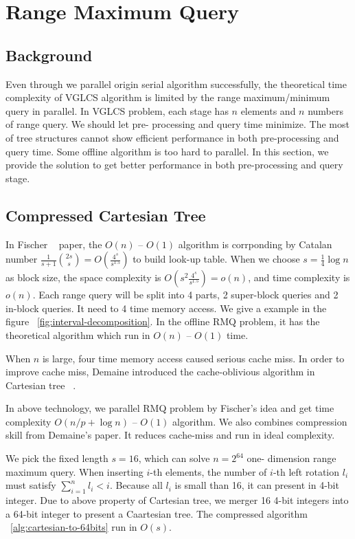 \section{Range Maximum Query}
\label{sec:parallelRMQ}

\subsection{Background}

Even through we parallel origin serial algorithm successfully, the
theoretical time complexity of VGLCS algorithm is limited by the range
maximum/minimum query in parallel.  In VGLCS problem, each stage has
$n$ elements and $n$ numbers of range query.  We should let pre-
processing and query time minimize.  The most of tree structures
cannot show efficient performance in both pre-processing and query
time.  Some offline algorithm is too hard to parallel.  In this
section, we provide the solution to get better performance in both
pre-processing and query stage.

\subsection{Compressed Cartesian Tree}

In Fischer ~\cite{fischer} paper, the $O(n)$ -- $O(1)$ algorithm is
corrponding by Catalan number $\frac{1}{s+1}\binom{2s}{s} =
O(\frac{4^s}{s^{1.5}})$ to build look-up table.  When we choose $s =
\frac{1}{4} \log n$ as block size, the space complexity is $O(s^2
\frac{4^s}{s^{1.5}}) = o(n)$, and time complexity is $o(n)$.  Each
range query will be split into 4 parts, 2 super-block queries and 2
in-block queries. It need to 4 time memory access.  We give a example
in the figure ~\ref{fig:interval-decomposition}.  In the offline RMQ
problem, it has the theoretical algorithm which run in $O(n)$ --
$O(1)$ time.

When $n$ is large, four time memory access caused serious cache miss.
In order to improve cache miss, Demaine introduced the cache-oblivious
algorithm in Cartesian tree ~\cite{demaine}.

In above technology, we parallel RMQ problem by Fischer's idea and get
time complexity $O(n / p + \log n)$ -- $O(1)$ algorithm.  We also
combines compression skill from Demaine's paper. It reduces cache-miss
and run in ideal complexity.

We pick the fixed length $s = 16$, which can solve $n = 2^{64}$ one-
dimension range maximum query.  When inserting $i$-th elements, the
number of $i$-th left rotation $l_i$ must satisfy $\sum_{i=1}^{n} l_i
< i$.  Because all $l_i$ is small than 16, it can present in 4-bit
integer.  Due to above property of Cartesian tree, we merger 16 4-bit
integers into a 64-bit integer to present a Caartesian tree.  The
compressed algorithm ~\ref{alg:cartesian-to-64bits} run in $O(s)$.

